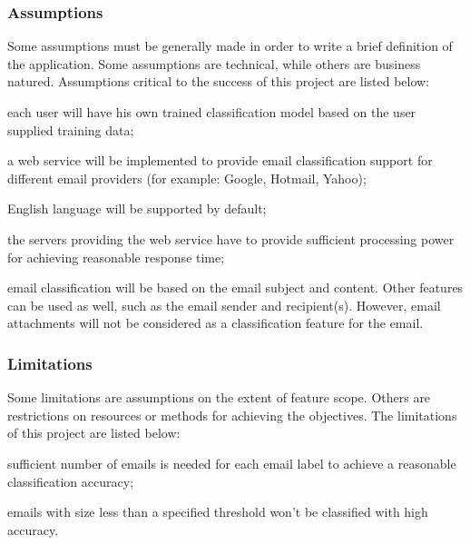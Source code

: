 \subsubsection{Assumptions}
Some assumptions must be generally made in order to write a brief definition 
of the application. Some assumptions are technical, while others are business natured.  Assumptions 
critical to the success of this project are listed below:
\begin{my_itemize}
  \item each user will have his own trained classification model based on the user supplied training data;
  \item a web service will be implemented to provide email classification support for different email 
	providers (for example: Google, Hotmail, Yahoo);
  \item English language will be supported by default;
  \item the servers providing the web service have to provide sufficient 
	processing power for achieving reasonable response time;
  \item email classification will be based on the email subject and content. 
	Other features can be used as well, such as the email sender and recipient(s). 
	However, email attachments will not be considered as a classification feature for the email.
\end{my_itemize}

\subsubsection{Limitations}
Some limitations are assumptions on the extent of feature scope. Others are restrictions on resources 
or methods for achieving the objectives. The limitations of this project are listed below:

\begin{my_itemize}
  \item sufficient number of emails is needed for each email label to achieve 
	a reasonable classification accuracy;
  \item emails with size less than a specified threshold won't be classified with
  high accuracy.
\end{my_itemize}

